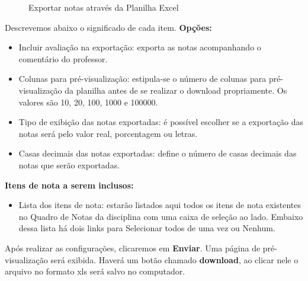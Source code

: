  \begin{figure}[htbp]
 \begin{center}
  \caption{Exportar notas através da Planilha Excel}
  \label{fig:cap6_25}
 \end{center}
\end{figure}

Descrevemos abaixo o significado de cada item.
\textbf{Opções:}
\begin{itemize}
 \item Incluir avaliação na exportação: exporta as notas acompanhando o comentário do professor.
 \item Colunas para pré-visualização: estipula-se o número de colunas para pré-visualização da planilha antes de se realizar o download propriamente. Os valores são 10, 20, 100, 1000 e 100000.
 \item Tipo de exibição das notas exportadas: é possível escolher se a exportação das notas será pelo valor real, porcentagem ou letras.
 \item Casas decimais das notas exportadas: define o número de casas decimais das notas que serão exportadas.
\end{itemize}
\textbf{ Itens de nota a serem inclusos:}
\begin{itemize}
 \item Lista dos itens de nota: estarão listados aqui todos os itens de nota existentes no Quadro de Notas da disciplina com uma caixa de seleção ao lado. Embaixo dessa lista há dois links para Selecionar todos de uma vez ou Nenhum.
\end{itemize}
Após realizar as configurações, clicaremos em \textbf{Enviar}. Uma página de pré-visualização será exibida. Haverá um botão chamado \textbf{download}, ao clicar nele o arquivo no formato xls será salvo no computador. 
